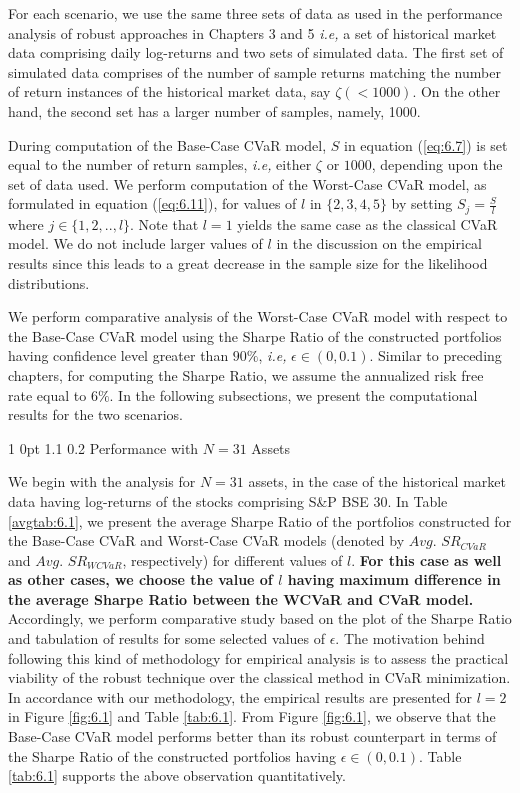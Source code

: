 \documentclass[12pt]{article}
\makeatletter
\numberwithin{equation}{section}
\renewcommand{\subsubsection}{
  \@startsection
  {subsubsection}%
  {1}%
  {0pt}%
  {1.1\baselineskip}%
  {0.2\baselineskip}%
  {\sc \centering}%
}
\makeatother
\begin{document}
For each scenario, we use the same three sets of data as used in the performance analysis of robust approaches in Chapters 3 and 5 \textit{i.e,} a set of historical market data comprising daily log-returns and two sets of simulated data. The first set of simulated data comprises of the number of sample returns matching the number of return instances of the historical market data, say $\zeta (<1000)$. On the other hand, the second set has a larger number of samples, namely, 1000.

During computation of the Base-Case CVaR model, $S$ in equation (\ref{eq:6.7}) is set equal to the number of return samples, \textit{i.e,} either $\zeta$ or $1000$, depending upon the set of data used. We perform computation of the Worst-Case CVaR model, as formulated in equation (\ref{eq:6.11}), for values of $l$ in $\{2,3,4,5\}$ by setting $\displaystyle{S_{j}=\frac{S}{l}}$ where $\displaystyle{j \in \{1,2,..,l \}}$. Note that $l=1$ yields the same case as the classical CVaR model. We do not include larger values of $l$ in the discussion on the empirical results since this leads to a great decrease in the sample size for the likelihood distributions.

We perform comparative analysis of the Worst-Case CVaR model with respect to the Base-Case CVaR model using the Sharpe Ratio of the constructed portfolios having confidence level greater than $90\%$, \textit{i.e,} $\epsilon \in (0,0.1)$. Similar to preceding chapters, for computing the Sharpe Ratio, we assume the annualized risk free rate equal to $6\%$. In the following subsections, we present the computational results for the two scenarios.

\subsubsection{Performance with $N=31$ Assets}

We begin with the analysis for $N=31$ assets, in the case of the historical market data having log-returns of the stocks comprising S\&P BSE 30. In Table \ref{avgtab:6.1}, we present the average Sharpe Ratio of the portfolios constructed for the Base-Case CVaR and Worst-Case CVaR models (denoted by $Avg. \, \, SR_{CVaR}$ and $Avg. \, \, SR_{WCVaR}$, respectively) for different values of $l$. \textbf{For this case as well as other cases, we choose the value of $l$ having maximum difference in the average Sharpe Ratio between the WCVaR and CVaR model.} Accordingly, we perform comparative study based on the plot of the Sharpe Ratio and tabulation of results for some selected values of $\epsilon$. The motivation behind following this kind of methodology for empirical analysis is to assess the practical viability of the robust technique over the classical method in CVaR minimization. In accordance with our methodology, the empirical results are presented for $l=2$ in Figure \ref{fig:6.1} and Table \ref{tab:6.1}. From Figure \ref{fig:6.1}, we observe that the Base-Case CVaR model performs better than its robust counterpart in terms of the Sharpe Ratio of the constructed portfolios having $\epsilon \in (0,0.1)$. Table \ref{tab:6.1} supports the above observation quantitatively.
\end{document}
